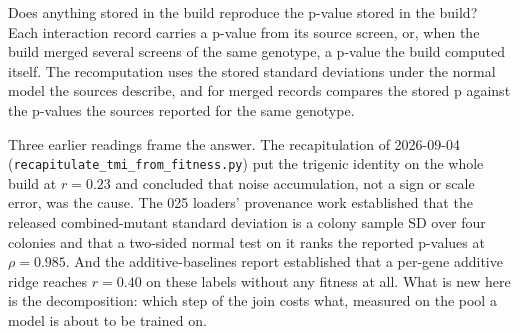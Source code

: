 Does anything stored in the build reproduce the p-value stored in the build? Each
interaction record carries a p-value from its source screen, or, when the build merged
several screens of the same genotype, a p-value the build computed itself. The
recomputation uses the stored standard deviations under the normal model the sources
describe, and for merged records compares the stored p against the p-values the
sources reported for the same genotype.

Three earlier readings frame the answer. The recapitulation of 2026-09-04
(\texttt{recapitulate\_tmi\_from\_fitness.py}) put the trigenic identity on the whole
build at $r = 0.23$ and concluded that noise accumulation, not a sign or scale error,
was the cause. The 025 loaders' provenance work established that the released
combined-mutant standard deviation is a colony sample SD over four colonies and that a
two-sided normal test on it ranks the reported p-values at $\rho = 0.985$. And the
additive-baselines report established that a per-gene additive ridge reaches
$r = 0.40$ on these labels without any fitness at all. What is new here is the
decomposition: which step of the join costs what, measured on the pool a model is
about to be trained on.
